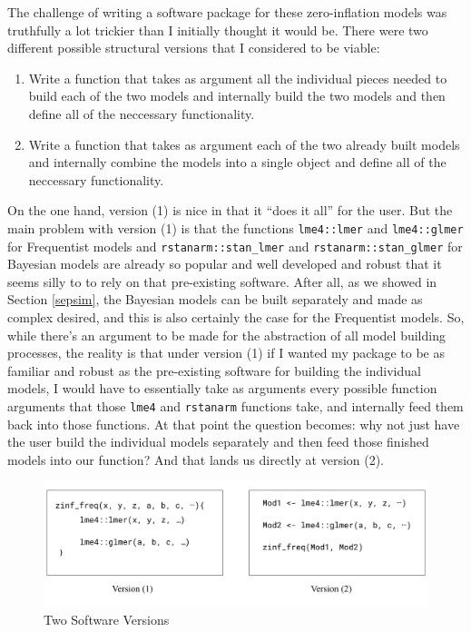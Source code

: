 \documentclass[12pt,twoside]{reedthesis}
\providecommand{\tightlist}{%
  \setlength{\itemsep}{0pt}\setlength{\parskip}{0pt}}
\begin{document}
The challenge of writing a software package for these zero-inflation models was truthfully a lot trickier than I initially thought it would be. There were two different possible structural versions that I considered to be viable:
\begin{enumerate}
\def\labelenumi{\arabic{enumi}.}
\tightlist
\item
  Write a function that takes as argument all the individual pieces needed to build each of the two models and internally build the two models and then define all of the neccessary functionality.
\item
  Write a function that takes as argument each of the two already built models and internally combine the models into a single object and define all of the neccessary functionality.
\end{enumerate}
On the one hand, version (1) is nice in that it ``does it all'' for the user. But the main problem with version (1) is that the functions \texttt{lme4::lmer} and \texttt{lme4::glmer} for Frequentist models and \texttt{rstanarm::stan\_lmer} and \texttt{rstanarm::stan\_glmer} for Bayesian models are already so popular and well developed and robust that it seems silly to to rely on that pre-existing software. After all, as we showed in Section \ref{sepsim}, the Bayesian models can be built separately and made as complex desired, and this is also certainly the case for the Frequentist models. So, while there's an argument to be made for the abstraction of all model building processes, the reality is that under version (1) if I wanted my package to be as familiar and robust as the pre-existing software for building the individual models, I would have to essentially take as arguments every possible function arguments that those \texttt{lme4} and \texttt{rstanarm} functions take, and internally feed them back into those functions. At that point the question becomes: why not just have the user build the individual models separately and then feed those finished models into our function? And that lands us directly at version (2).
\begin{figure}

{\centering \includegraphics[width=0.9\linewidth]{figure/v1v2} 

}

\caption{Two Software Versions}\label{fig:tbl2}
\end{figure}
\end{document}
